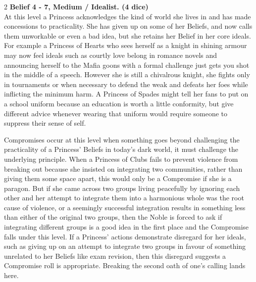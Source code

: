 \begin{multicols}{2}
\noindent\textbf{Belief 4 - 7, Medium / Idealist. (4 dice)} \\

\noindent At this level a Princess acknowledges the kind of world she lives in and has made concessions to practicality. She has given up on some of her Beliefs, and now calls them unworkable or even a bad idea, but she retains her Belief in her core ideals. For example a Princess of Hearts who sees herself as a knight in shining armour may now feel ideals such as courtly love belong in romance novels and announcing herself to the Mafia goons with a formal challenge just gets you shot in the middle of a speech. However she is still a chivalrous knight, she fights only in tournaments or when necessary to defend the weak and defeats her foes while inflicting the minimum harm. A Princess of Spades might tell her fans to put on a school uniform because an education is worth a little conformity, but give different advice whenever wearing that uniform would require someone to suppress their sense of self. 

Compromises occur at this level when something goes beyond challenging the practicality of a Princess' Beliefs in today's dark world, it must challenge the underlying principle. When a Princess of Clubs fails to prevent violence from breaking out because she insisted on integrating two communities, rather than giving them some space apart, this would only be a Compromise if she is a paragon. But if she came across two groups living peacefully by ignoring each other and her attempt to integrate them into a harmonious whole was the root cause of violence, or a seemingly successful integration results in something less than either of the original two groups, then the Noble is forced to ask if integrating different groups is a good idea in the first place and the Compromise falls under this level. If a Princess' actions demonstrate disregard for her ideals, such as giving up on an attempt to integrate two groups in favour of something unrelated to her Beliefs like exam revision, then this disregard suggests a Compromise roll is appropriate. Breaking the second oath of one's calling lands here. 


\end{multicols}
